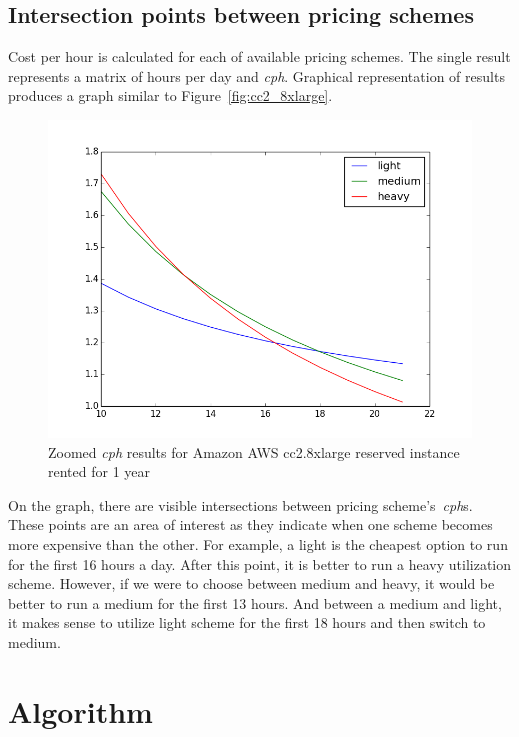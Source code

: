\documentclass[]{final_report}
\begin{document}
\subsection{Intersection points between pricing schemes}

Cost per hour is calculated for each of available pricing schemes. The single result represents a matrix of hours per day and \textit{cph}. Graphical representation of results produces a graph similar to Figure~\ref{fig:cc2_8xlarge}. \par 
\begin{figure}[H]
	\includegraphics[width=\linewidth]{figures/cph_cc2_8xlarge_zoom}
	\caption{Zoomed \textit{cph} results for Amazon AWS cc2.8xlarge reserved instance rented for 1 year~\cite{AWS:light}~\cite{AWS:medium}~\cite{AWS:heavy}}
	\label{fig:cph_cc2_8xlarge_zoom}
\end{figure}

On the graph, there are visible intersections between pricing scheme's~\textit{cph}s. These points are an area of interest as they indicate when one scheme becomes more expensive than the other. For example, a light is the cheapest option to run for the first 16 hours a day. After this point, it is better to run a heavy utilization scheme. However, if we were to choose between medium and heavy, it would be better to run a medium for the first 13 hours. And between a medium and light, it makes sense to utilize light scheme for the first 18 hours and then switch to medium. 

\section{Algorithm}
\end{document}
